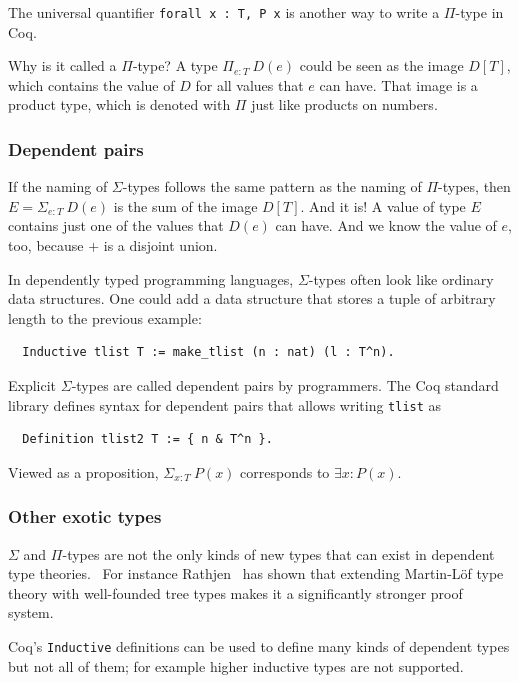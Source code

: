 \documentclass[english, 12pt, a4paper, sci, a-1b, online]{aaltothesis}
\newcommand\icoq[1]{\texttt{#1}}
\begin{document}
The universal quantifier \icoq{forall x : T, P x} is another way to write a $\Pi$-type in Coq.

Why is it called a $\Pi$-type? A type $\Pi_{e:T}~D(e)$ could be seen as the image $D[T]$, which contains the value of $D$ for all values that $e$ can have. That image is a product type, which is denoted with $\Pi$ just like products on numbers.

\subsubsection{Dependent pairs}

If the naming of $\Sigma$-types follows the same pattern as the naming of $\Pi$-types, then $E = \Sigma_{e:T}~D(e)$ is the sum of the image $D[T]$. And it is! A value of type $E$ contains just one of the values that $D(e)$ can have. And we know the value of $e$, too, because $+$ is a disjoint union.

In dependently typed programming languages, $\Sigma$-types often look like ordinary data structures. One could add a data structure that stores a tuple of arbitrary length to the previous example:
\begin{verbatim}
  Inductive tlist T := make_tlist (n : nat) (l : T^n).
\end{verbatim}
Explicit $\Sigma$-types are called dependent pairs by programmers. The Coq standard library defines syntax for dependent pairs that allows writing \icoq{tlist} as
\begin{verbatim}
  Definition tlist2 T := { n & T^n }.
\end{verbatim}

Viewed as a proposition, $\Sigma_{x:T}~P(x)$ corresponds to $\exists x : P(x)$.

\subsubsection{Other exotic types}

$\Sigma$ and $\Pi$-types are not the only kinds of new types that can exist in dependent type theories.~\cite{hofmann1997syntax} For instance Rathjen~\cite{griffor1994strength} has shown that extending Martin-Löf type theory with well-founded tree types makes it a significantly stronger proof system.

Coq's \icoq{Inductive} definitions can be used to define many kinds of dependent types but not all of them; for example higher inductive types are not supported.
\end{document}
